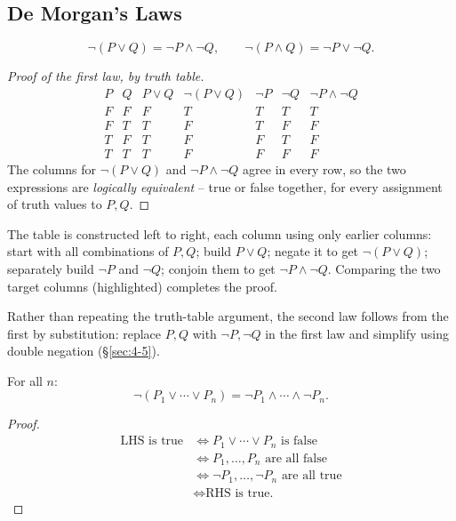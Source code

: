 \subsection{De Morgan's Laws}
\label{sec:4-8}

\begin{theorem}
\[
\neg(P \vee Q) = \neg P \wedge \neg Q, \qquad \neg(P \wedge Q) = \neg P \vee \neg Q.
\]
\end{theorem}

\bigskip
\begin{proof}[Proof of the first law, by truth table]
\[
\begin{array}{cc|c|c|cc|c}
P & Q & P\vee Q & \neg(P\vee Q) & \neg P & \neg Q & \neg P \wedge \neg Q \\ \hline
F & F & F & T & T & T & T \\
F & T & T & F & T & F & F \\
T & F & T & F & F & T & F \\
T & T & T & F & F & F & F
\end{array}
\]
The columns for $\neg(P\vee Q)$ and $\neg P \wedge \neg Q$ agree in every row, so the two expressions are \emph{logically equivalent} -- true or false together, for every assignment of truth values to $P,Q$.
\end{proof}

\bigskip
\begin{note}
The table is constructed left to right, each column using only earlier columns: start with all combinations of $P,Q$; build $P\vee Q$; negate it to get $\neg(P\vee Q)$; separately build $\neg P$ and $\neg Q$; conjoin them to get $\neg P \wedge \neg Q$. Comparing the two target columns (highlighted) completes the proof.
\end{note}

\bigskip
\begin{note}
Rather than repeating the truth-table argument, the second law follows from the first by substitution: replace $P,Q$ with $\neg P, \neg Q$ in the first law and simplify using double negation (\S\ref{sec:4-5}).
\end{note}

\bigskip
\begin{theorem}
For all $n$:
\[
\neg(P_1 \vee \cdots \vee P_n) = \neg P_1 \wedge \cdots \wedge \neg P_n.
\]
\end{theorem}
\begin{proof}
\begin{align*}
\text{LHS is true} &\iff P_1 \vee \cdots \vee P_n \text{ is false} \\
&\iff P_1,\dots,P_n \text{ are all false} \\
&\iff \neg P_1,\dots,\neg P_n \text{ are all true} \\
&\iff \text{RHS is true.}
\end{align*}
\end{proof}

